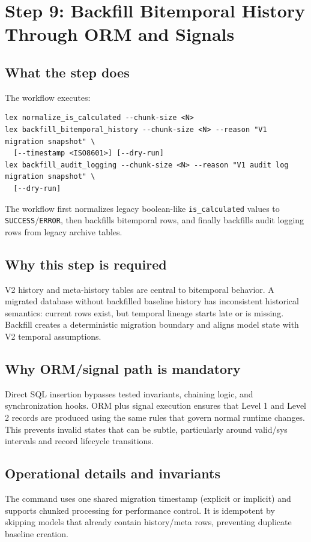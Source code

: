 \documentclass[11pt,a4paper]{article}
\begin{document}
\newpage
\section{Step 9: Backfill Bitemporal History Through ORM and Signals}
\subsection*{What the step does}
The workflow executes:
\begin{verbatim}
lex normalize_is_calculated --chunk-size <N>
lex backfill_bitemporal_history --chunk-size <N> --reason "V1 migration snapshot" \
  [--timestamp <ISO8601>] [--dry-run]
lex backfill_audit_logging --chunk-size <N> --reason "V1 audit log migration snapshot" \
  [--dry-run]
\end{verbatim}
The workflow first normalizes legacy boolean-like \texttt{is\_calculated} values to
\texttt{SUCCESS}/\texttt{ERROR}, then backfills bitemporal rows, and finally backfills
audit logging rows from legacy archive tables.

\subsection*{Why this step is required}
V2 history and meta-history tables are central to bitemporal behavior. A migrated database
without backfilled baseline history has inconsistent historical semantics: current rows exist,
but temporal lineage starts late or is missing. Backfill creates a deterministic migration
boundary and aligns model state with V2 temporal assumptions.

\subsection*{Why ORM/signal path is mandatory}
Direct SQL insertion bypasses tested invariants, chaining logic, and synchronization hooks.
ORM plus signal execution ensures that Level 1 and Level 2 records are produced using the same
rules that govern normal runtime changes. This prevents invalid states that can be subtle,
particularly around valid/sys intervals and record lifecycle transitions.

\subsection*{Operational details and invariants}
The command uses one shared migration timestamp (explicit or implicit) and supports chunked
processing for performance control. It is idempotent by skipping models that already contain
history/meta rows, preventing duplicate baseline creation.
\end{document}
